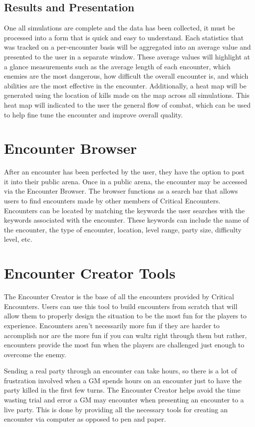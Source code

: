 \documentclass[12pt,a4paper]{report}
\begin{document}
		\subsection{Results and Presentation}
		One all simulations are complete and the data has been collected, it must be processed into a form that is quick and easy to understand. Each statistics that was tracked on a per-encounter basis will be aggregated into an average value and presented to the user in a separate window. These average values will highlight at a glance measurements such as the average length of each encounter, which enemies are the most dangerous, how difficult the overall encounter is, and which abilities are the most effective in the encounter. Additionally, a heat map will be generated using the location of kills made on the map across all simulations. This heat map will indicated to the user the general flow of combat, which can be used to help fine tune the encounter and improve overall quality. 
	
	\section{Encounter Browser}
	After an encounter has been perfected by the user, they have the option to post it into their public arena. Once in a public arena, the encounter may be accessed via the Encounter Browser. The browser functions as a search bar that allows users to find encounters made by other members of Critical Encounters. Encounters can be located by matching the keywords the user searches with the keywords associated with the encounter. These keywords can include the name of the encounter, the type of encounter, location, level range, party size, difficulty level, etc.
	\newpage
	\section{Encounter Creator Tools}
	The Encounter Creator is the base of all the encounters provided by Critical Encounters. Users can use this tool to build encounters from scratch that will allow them to properly design the situation to be the most fun for the players to experience. Encounters aren't necessarily more fun if they are harder to accomplish nor are the more fun if you can waltz right through them but rather, encounters provide the most fun when the players are challenged just enough to overcome the enemy. 
	
	Sending a real party through an encounter can take hours, so there is a lot of frustration involved when a GM spends hours on an encounter just to have the party killed in the first few turns. The Encounter Creator helps avoid the time wasting trial and error a GM may encounter when presenting an encounter to a live party. This is done by providing all the necessary tools for creating an encounter via computer as opposed to pen and paper.
\end{document}

